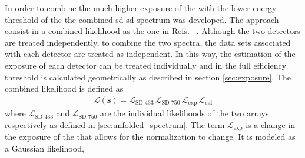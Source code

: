 \documentclass[main.tex]{subfiles}
\begin{document}
In order to combine the much higher exposure of the  with the lower energy threshold of the  the combined \gls{sd}-\gls{sd} spectrum was developed.
The approach consist in a combined likelihood as the one in Refs. ~\cite{PierreAuger:2021:InfillSpectrum,2025:CombinedVertical}.
Although the two detectors are treated independently, to combine the two spectra, the  data sets associated with each detector are treated as independent.
In this way, the estimation of the exposure of each detector can be treated individually and in the full efficiency threshold is calculated geometrically as described in section \cref{sec:exposure}.
The combined likelihood is defined as
\begin{align}
    \mathcal{L}(\mathbf{s})=\mathcal{L}_{\text{SD-433}}\,\mathcal{L}_{\text{SD-750}}\,\mathcal{L}_{\text{exp}}\,\mathcal{L}_{\text{cal}}
\end{align}
\noindent where $\mathcal{L}_{\text{SD-433}}$ and $\mathcal{L}_{\text{SD-750}}$ are the individual likelihoods of the two arrays respectively as defined in \cref{sec:unfolded_spectrum}.
The term $\mathcal{L}_{\text{exp}}$ is a change in the exposure of the  that allows for the normalization to change. It is modeled as a Gaussian likelihood,
\end{document}
